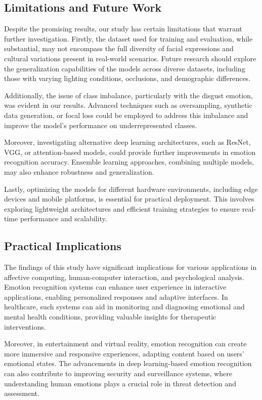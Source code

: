 \documentclass[conference]{IEEEtran}
\begin{document}
\subsection{Limitations and Future Work}
Despite the promising results, our study has certain limitations that warrant further investigation. Firstly, the dataset used for training and evaluation, while substantial, may not encompass the full diversity of facial expressions and cultural variations present in real-world scenarios. Future research should explore the generalization capabilities of the models across diverse datasets, including those with varying lighting conditions, occlusions, and demographic differences.

Additionally, the issue of class imbalance, particularly with the disgust emotion, was evident in our results. Advanced techniques such as oversampling, synthetic data generation, or focal loss could be employed to address this imbalance and improve the model's performance on underrepresented classes.

Moreover, investigating alternative deep learning architectures, such as ResNet, VGG, or attention-based models, could provide further improvements in emotion recognition accuracy. Ensemble learning approaches, combining multiple models, may also enhance robustness and generalization.

Lastly, optimizing the models for different hardware environments, including edge devices and mobile platforms, is essential for practical deployment. This involves exploring lightweight architectures and efficient training strategies to ensure real-time performance and scalability.

\subsection{Practical Implications}
The findings of this study have significant implications for various applications in affective computing, human-computer interaction, and psychological analysis. Emotion recognition systems can enhance user experience in interactive applications, enabling personalized responses and adaptive interfaces. In healthcare, such systems can aid in monitoring and diagnosing emotional and mental health conditions, providing valuable insights for therapeutic interventions.

Moreover, in entertainment and virtual reality, emotion recognition can create more immersive and responsive experiences, adapting content based on users' emotional states. The advancements in deep learning-based emotion recognition can also contribute to improving security and surveillance systems, where understanding human emotions plays a crucial role in threat detection and assessment.
\end{document}
